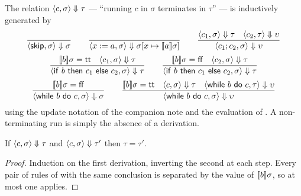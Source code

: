 \begin{definition}
\label{def:bigstep}
The relation $\langle c, \sigma\rangle \Downarrow \tau$ --- ``running $c$ in $\sigma$
terminates in $\tau$'' --- is inductively generated by
\[
  \frac{}{\langle \mathsf{skip}, \sigma\rangle \Downarrow \sigma}
  \qquad
  \frac{}{\langle x := a, \sigma\rangle \Downarrow \sigma[x \mapsto [\![a]\!]\sigma]}
  \qquad
  \frac{\langle c_1, \sigma\rangle \Downarrow \tau \quad \langle c_2, \tau\rangle \Downarrow \upsilon}
       {\langle c_1 ; c_2, \sigma\rangle \Downarrow \upsilon}
\]
\[
  \frac{[\![b]\!]\sigma = \mathsf{tt} \quad \langle c_1, \sigma\rangle \Downarrow \tau}
       {\langle \mathsf{if}\ b\ \mathsf{then}\ c_1\ \mathsf{else}\ c_2, \sigma\rangle \Downarrow \tau}
  \qquad
  \frac{[\![b]\!]\sigma = \mathsf{ff} \quad \langle c_2, \sigma\rangle \Downarrow \tau}
       {\langle \mathsf{if}\ b\ \mathsf{then}\ c_1\ \mathsf{else}\ c_2, \sigma\rangle \Downarrow \tau}
\]
\[
  \frac{[\![b]\!]\sigma = \mathsf{ff}}
       {\langle \mathsf{while}\ b\ \mathsf{do}\ c, \sigma\rangle \Downarrow \sigma}
  \qquad
  \frac{[\![b]\!]\sigma = \mathsf{tt} \quad
        \langle c, \sigma\rangle \Downarrow \tau \quad
        \langle \mathsf{while}\ b\ \mathsf{do}\ c, \tau\rangle \Downarrow \upsilon}
       {\langle \mathsf{while}\ b\ \mathsf{do}\ c, \sigma\rangle \Downarrow \upsilon}
\]
using the update notation of the companion note and the evaluation of
. A non-terminating run is simply the absence of a derivation.
\end{definition}

\begin{lemma}[determinism]
\label{lem:bigstep-det}
If $\langle c, \sigma\rangle \Downarrow \tau$ and $\langle c, \sigma\rangle \Downarrow \tau'$ then
$\tau = \tau'$.
\end{lemma}

\begin{proof}
Induction on the first derivation, inverting the second at each step. Every
pair of rules of  with the same conclusion is separated by
the value of $[\![b]\!]\sigma$, so at most one applies.
\end{proof}
